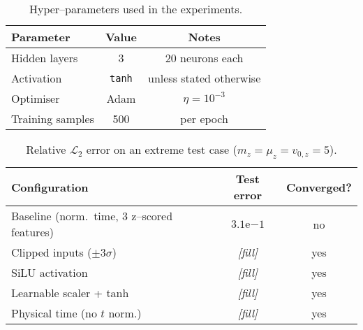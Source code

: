 \begin{table}[ht]
  \centering
  \caption{Hyper--parameters used in the experiments.}
  \label{tab:pinn_hparams}
  \begin{tabular}{lcc}
    \toprule
    Parameter & Value & Notes\\
    \midrule
    Hidden layers & 3 & 20 neurons each\\
    Activation & \texttt{tanh} & unless stated otherwise\\
    Optimiser & Adam & $\eta=10^{-3}$\\
    Training samples & 500 & per epoch\\
    \bottomrule
  \end{tabular}
\end{table}

\begin{table}[ht]
  \centering
  \caption{Relative $\mathcal L_2$ error on an extreme test case
    ($m_z=\mu_z=v_{0,z}=5$).}
  \label{tab:mitigation_results}
  \begin{tabular}{lcc}
    \toprule
    Configuration & Test error & Converged?\\
    \midrule
    Baseline (norm.\ time, 3 z--scored features) & $3.1\mathrm{e}{-1}$ & no\\
    Clipped inputs ($\pm3\sigma$) & \emph{[fill]} & yes\\
    SiLU activation & \emph{[fill]} & yes\\
    Learnable scaler + tanh & \emph{[fill]} & yes\\
    Physical time (no $t$ norm.) & \emph{[fill]} & yes\\
    \bottomrule
  \end{tabular}
\end{table}
